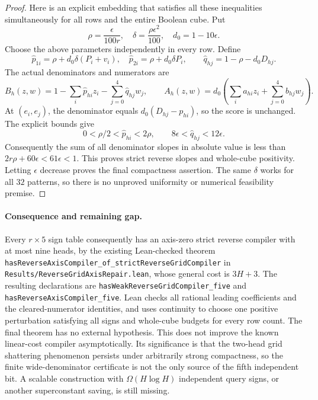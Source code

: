 \documentclass[11pt]{article}
\begin{document}
\begin{proof}
Here is an explicit embedding that satisfies all these inequalities
simultaneously for all rows and the entire Boolean cube. Put
\[
 \rho=\frac{\epsilon}{100r},\quad
 \delta=\frac{\rho\epsilon^2}{100},\quad d_0=1-10\epsilon.
\]
Choose the above parameters independently in every row. Define
\[
 \widehat p_{1i}=\rho+d_0\delta(P_i+v_i),\quad
 \widehat p_{2i}=\rho+d_0\delta P_i,\qquad
 \widehat q_{hj}=1-\rho-d_0D_{hj}.
\]
The actual denominators and numerators are
\[
 B_h(z,w)=1-\sum_i\widehat p_{hi}z_i
                -\sum_{j=0}^4\widehat q_{hj}w_j,
 \qquad
 A_h(z,w)=d_0\left(\sum_i a_{hi}z_i+
                             \sum_{j=0}^4 b_{hj}w_j\right).
\]
At $(e_i,e_j)$, the denominator equals
$d_0(D_{hj}-p_{hi})$, so the score is unchanged. The explicit bounds give
\[
 0<\rho/2<\widehat p_{hi}<2\rho,\qquad
 8\epsilon<\widehat q_{hj}<12\epsilon.
\]
Consequently the sum of all denominator slopes in absolute value is
less than $2r\rho+60\epsilon<61\epsilon<1$. This proves strict
reverse slopes and whole-cube positivity. Letting $\epsilon$ decrease
proves the final compactness assertion. The same $\delta$ works for
all $32$ patterns, so there is no unproved uniformity or numerical
feasibility premise.
\end{proof}

\paragraph{Consequence and remaining gap.}
Every $r\times5$ sign table consequently has an axis-zero strict reverse
compiler with at most nine heads, by the existing Lean-checked theorem
\texttt{hasReverseAxisCompiler\_of\_strictReverseGridCompiler} in
\texttt{Results/ReverseGridAxisRepair.lean}, whose general cost is
$3H+3$. The resulting declarations are
\texttt{hasWeakReverseGridCompiler\_five} and
\texttt{hasReverseAxisCompiler\_five}. Lean checks all rational leading
coefficients and the cleared-numerator identities, and uses continuity
to choose one positive perturbation satisfying all signs and whole-cube
budgets for every row count. The final theorem has no external hypothesis. This does not improve the known
linear-cost compiler asymptotically. Its significance is that the two-head
grid shattering phenomenon persists under arbitrarily strong compactness,
so the finite wide-denominator certificate is not the only source of the
fifth independent bit. A scalable construction with $\Omega(H\log H)$
independent query signs, or another superconstant saving, is still missing.
\end{document}
